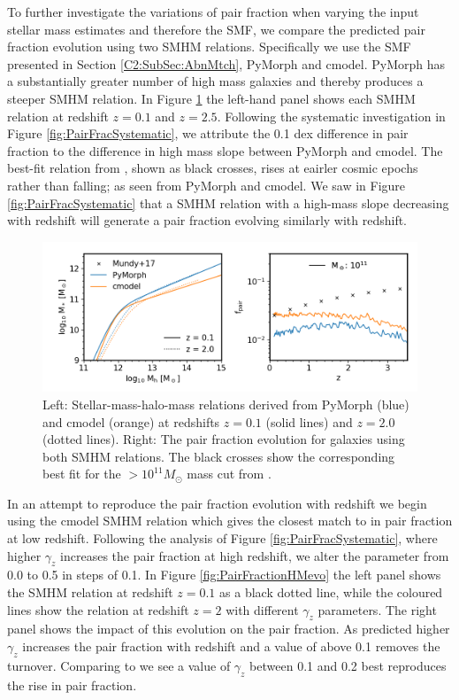 To further investigate the variations of pair fraction when varying the input stellar mass estimates and therefore the SMF, we compare the predicted pair fraction evolution using two SMHM relations. Specifically we use the SMF presented in Section \ref{C2:SubSec:AbnMtch}, PyMorph and cmodel. PyMorph has a substantially greater number of high mass galaxies and thereby produces a steeper SMHM relation.
In Figure \ref{fig:PairFractionData} the left-hand panel shows each SMHM relation at redshift $z = 0.1$ and $z = 2.5$. Following the systematic investigation in Figure \ref{fig:PairFracSystematic}, we attribute the 0.1 dex difference in pair fraction to the difference in high mass slope between PyMorph and cmodel. The best-fit relation from \citet{Mundy2017A3.5}, shown as black crosses, rises at eairler cosmic epochs rather than falling; as seen from PyMorph and cmodel. We saw in Figure \ref{fig:PairFracSystematic} that a SMHM relation with a high-mass slope decreasing with redshift will generate a pair fraction evolving similarly with redshift.

\begin{figure}
	\centering
	\includegraphics[width = \linewidth]{Figures/Chapter5/PairFractionData.png}
    \caption{Left: Stellar-mass-halo-mass relations derived from PyMorph (blue) and cmodel (orange) at redshifts $z=0.1$ (solid lines) and $z=2.0$ (dotted lines). Right: The pair fraction evolution for galaxies using both SMHM relations. The black crosses show the corresponding best fit for the $>10^{11}M_{\odot}$ mass cut from \citet{Mundy2017A3.5}.}
	\label{fig:PairFractionData}
\end{figure}

In an attempt to reproduce the \citet{Mundy2017A3.5} pair fraction evolution with redshift we begin using the cmodel SMHM relation which gives the closest match to \citet{Mundy2017A3.5} in pair fraction at low redshift. Following the analysis of Figure \ref{fig:PairFracSystematic}, where higher $\gamma_{z}$ increases the pair fraction at high redshift, we alter the parameter from 0.0 to 0.5 in steps of 0.1. In Figure \ref{fig:PairFractionHMevo} the left panel shows the SMHM relation at redshift $z=0.1$ as a black dotted line, while the coloured lines show the relation at redshift $z = 2$ with different $\gamma_{z}$ parameters. The right panel shows the impact of this evolution on the pair fraction. As predicted higher $\gamma_{z}$ increases the pair fraction with redshift and a value of above 0.1 removes the turnover. Comparing to \citet{Mundy2017A3.5} we see a value of $\gamma_{z}$ between 0.1 and 0.2 best reproduces the rise in pair fraction. 


